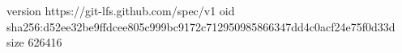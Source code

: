version https://git-lfs.github.com/spec/v1
oid sha256:d52ee32be9ffdcee805c999bc9172c712950985866347dd4c0acf24e75f0d33d
size 626416
